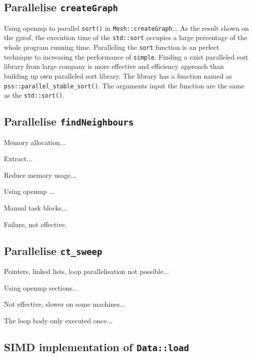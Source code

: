 \documentclass[conference]{IEEEtran}
\begin{document}
\subsection{Parallelise \texttt{createGraph}}

Using openmp to parallel \texttt{sort()} in \texttt{Mesh::createGraph}...
As the result shown on the gprof, the execution time of the \texttt{std::sort} occupies a large percentage of the whole program running time. Paralleling the \texttt{sort} function is an perfect technique to increasing the performance of \texttt{simple}. Finding a exist paralleled sort library from large company is more effective and efficiency approach than building up own paralleled sort library. \cite{parallelsort} The library has a function named as \texttt{pss::parallel\_stable\_sort()}. The arguments input the function are the same as the \texttt{std::sort()}. 

\subsection{Parallelise \texttt{findNeighbours}}

Memory allocation...

Extract...

Reduce memory usage...

Using openmp \cite{dagum1998openmp}...

Manual task blocks...

Failure, not effective.

\subsection{Parallelise \texttt{ct\_sweep}}

Pointers, linked lists, loop parallelisation not possible...

Using openmp sections...

Not effective, slower on some machines...

The loop body only executed once...

\subsection{SIMD implementation of \texttt{Data::load}}
\end{document}
